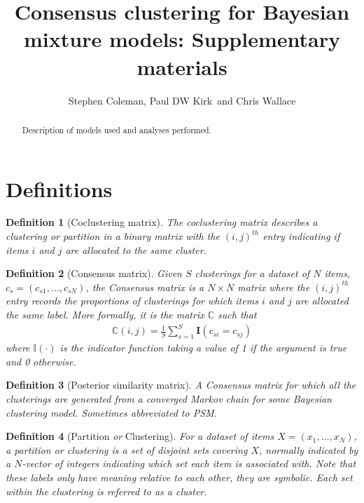 \documentclass[]{article}
\title{Consensus clustering for Bayesian mixture models: Supplementary materials}
\author{Stephen Coleman, Paul DW Kirk\, and Chris Wallace}
\newtheorem{definition}{Definition}
\begin{document}
\maketitle

\begin{abstract}
Description of models used and analyses performed.
\end{abstract}


\section{Definitions}
\begin{definition}[Coclustering matrix]
	The \emph{coclustering matrix} describes a clustering or partition in a binary matrix with the $(i, j)^{th}$ entry indicating if items $i$ and $j$ are allocated to the same cluster.
\end{definition}

\begin{definition}[Consensus matrix]
	Given $S$ clusterings for a dataset of $N$ items, $c_s=(c_{s1}, \ldots, c_{sN})$, the \emph{Consensus matrix} is a $N \times N$ matrix where the $(i, j )^{th}$ entry records the proportions of clusterings for which items $i$ and $j$ are allocated the same label. More formally, it is the matrix $\mathbb{C}$ such that
	\begin{align}
		\mathbb{C}(i, j) = \frac{1}{S} \sum_{s=1}^S \mathbf{I}(c_{si} = c_{sj})
	\end{align}
	where $\mathbb{I}(\cdot)$ is the indicator function taking a value of 1 if the argument is true and 0 otherwise.
\end{definition}

\begin{definition}[Posterior similarity matrix]
	A \emph{Consensus matrix} for which all the clusterings are generated from a converged Markov chain for some Bayesian clustering model. Sometimes abbreviated to \emph{PSM}.
\end{definition}

\begin{definition}[Partition \emph{or} Clustering]
	For a dataset of items $X=(x_1, \ldots, x_N)$, a \emph{partition} or \emph{clustering} is a set of disjoint sets covering $X$, normally indicated by a $N$-vector of integers indicating which set each item is associated with. Note that these labels only have meaning relative to each other, they are symbolic. Each set within the clustering is referred to as a \emph{cluster}.
\end{definition}
\end{document}
